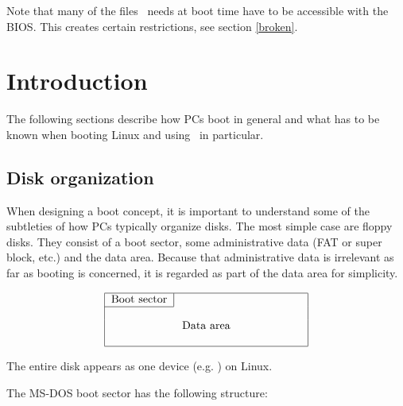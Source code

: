Note that many of the files \LILO\ needs at boot time have to be accessible
with the BIOS. This creates certain restrictions, see section \ref{broken}.


\newpage
\section{Introduction}

The following sections describe how PCs
boot in general and what has to be known when booting Linux and using
\LILO\ in particular.


\subsection{Disk organization}
\label{diskorg}

When designing a boot concept, it is important to understand some of the
subtleties of how PCs typically organize disks. The most simple case are
floppy disks. They consist of a boot sector, some administrative
data (FAT or super block, etc.) and the data area. Because that
administrative data is irrelevant as far as booting is concerned, it is
regarded as part of the data area for simplicity.

$$
\begin{tabular}{|c|c|}
  \hline
  Boot sector & \hbox to 1.5in{\hfil} \\
  \cline{1-1}
  \multicolumn{2}{|c|}{} \\
  \multicolumn{2}{|c|}{Data area} \\
  \multicolumn{2}{|c|}{} \\
  \hline
  \end{tabular}
$$

The entire disk appears as one device (e.g. ) on Linux.

The MS-DOS boot sector has the following structure:

